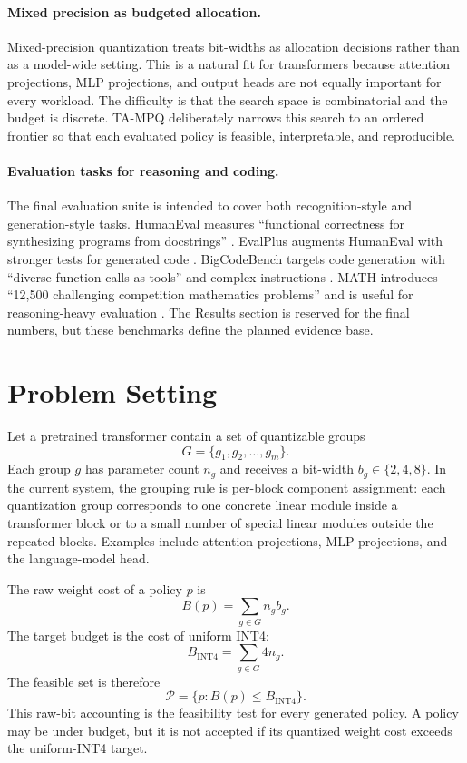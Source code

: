 \documentclass{article}
\newcommand{\method}{TA-MPQ}
\newcommand{\intfour}{INT4}
\begin{document}
\paragraph{Mixed precision as budgeted allocation.}
Mixed-precision quantization treats bit-widths as allocation decisions rather than as a model-wide setting. This is a natural fit for transformers because attention projections, MLP projections, and output heads are not equally important for every workload. The difficulty is that the search space is combinatorial and the budget is discrete. \method{} deliberately narrows this search to an ordered frontier so that each evaluated policy is feasible, interpretable, and reproducible.

\paragraph{Evaluation tasks for reasoning and coding.}
The final evaluation suite is intended to cover both recognition-style and generation-style tasks. HumanEval measures ``functional correctness for synthesizing programs from docstrings'' \cite{chen2021codex}. EvalPlus augments HumanEval with stronger tests for generated code \cite{liu2023evalplus}. BigCodeBench targets code generation with ``diverse function calls as tools'' and complex instructions \cite{zhuo2025bigcodebench}. MATH introduces ``12,500 challenging competition mathematics problems'' and is useful for reasoning-heavy evaluation \cite{hendrycks2021math}. The Results section is reserved for the final numbers, but these benchmarks define the planned evidence base.

\section{Problem Setting}

Let a pretrained transformer contain a set of quantizable groups
\[
G = \{g_1, g_2, \ldots, g_m\}.
\]
Each group $g$ has parameter count $n_g$ and receives a bit-width $b_g \in \{2,4,8\}$. In the current system, the grouping rule is per-block component assignment: each quantization group corresponds to one concrete linear module inside a transformer block or to a small number of special linear modules outside the repeated blocks. Examples include attention projections, MLP projections, and the language-model head.

The raw weight cost of a policy $p$ is
\[
B(p) = \sum_{g \in G} n_g b_g.
\]
The target budget is the cost of uniform \intfour{}:
\[
B_{\mathrm{INT4}} = \sum_{g \in G} 4n_g.
\]
The feasible set is therefore
\[
\mathcal{P} = \{p : B(p) \leq B_{\mathrm{INT4}}\}.
\]
This raw-bit accounting is the feasibility test for every generated policy. A policy may be under budget, but it is not accepted if its quantized weight cost exceeds the uniform-\intfour{} target.
\end{document}
